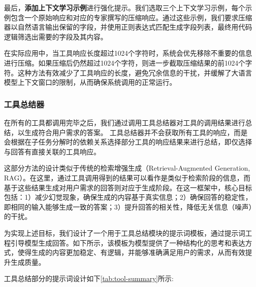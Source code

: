 最后，\textbf{添加上下文学习示例}进行强化提示。我们选取三个上下文学习示例，每个示例包含一个原始响应和对应的专家撰写的压缩响应。通过这些示例，我们要求压缩器以自然语言输出保留的字段，并使用正则表达式匹配生成字段列表，最终用代码逻辑筛选出需要的字段及其内容。

在实际应用中，当工具响应长度超过1024个字符时，系统会优先移除不重要的信息进行压缩。如果压缩后仍然超过1024个字符，则进一步截取压缩结果的前1024个字符。这种方法有效减少了工具响应的长度，避免冗余信息的干扰，并缓解了大语言模型上下文窗口的限制，从而确保系统调用的正常运行。


\subsubsection{工具总结器}

在所有的工具都调用完毕之后，我们通过调用工具总结器对工具的调用结果进行总结，以生成符合用户需求的答案。
工具总结器并不会获取所有工具的响应，而是会根据在子任务分解时的依赖关系选择部分工具的响应结果来进行总结，即仅选择与回答有直接关联的工具响应。

这部分方法的设计类似于传统的检索增强生成（Retrieval-Augmented Generation, RAG）。在这里，通过工具调用得到的结果可以看作是类似于检索阶段的信息，而基于这些结果生成对用户需求的回答则对应于生成阶段。在这一框架中，核心目标包括：1）减少幻觉现象，确保生成的内容基于真实信息；2）确保回答的稳定性，即相同的输入能够生成一致的答案；3）提升回答的相关性，降低无关信息（噪声）的干扰。

为实现上述目标，我们设计了一个用于工具总结模块的提示词模板，通过提示词工程引导模型生成回答。如下所示，该模板为模型提供了一种结构化的思考和表达方式，使得生成的内容更加稳定、有逻辑，并能够准确满足用户的需求，从而有效提升生成质量。

工具总结部分的提示词设计如下\ref{tab:tool-summary}所示:


